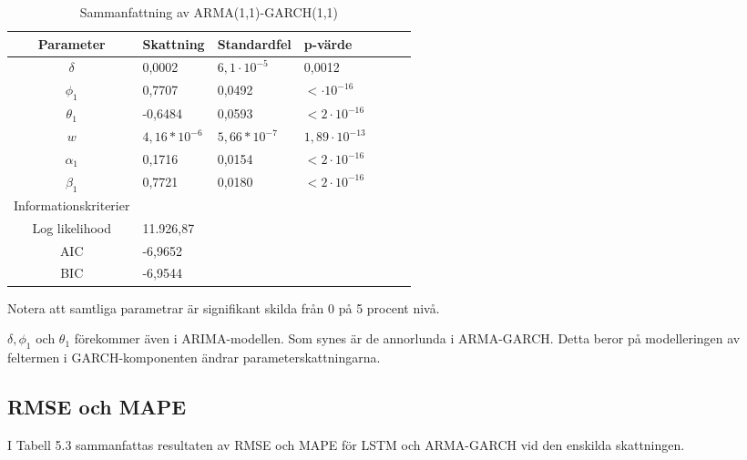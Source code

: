 \documentclass[11pt]{article}
\numberwithin{equation}{section}
\numberwithin{table}{section}
\numberwithin{figure}{section}
\begin{document}
\begin{table}[H]
\caption{Sammanfattning av ARMA(1,1)-GARCH(1,1)}
\begin{tabularx}{\textwidth}{c *{6}{Y}}
\toprule
Parameter  & Skattning & Standardfel & p-värde \\
\hline

$\delta$      & 0,0002         & $6,1\cdot10^{-5}$ & 0,0012           \\
$\phi_1$      & 0,7707         & 0,0492         & $<\cdot10^{-16}$    \\

$\theta_1$    & -0,6484        & 0,0593         & $<2\cdot10^{-16}$    \\
$w$           & $4,16*10^{-6}$ & $5,66*10^{-7}$ & $1,89\cdot10^{-13}$  \\

$\alpha_1$    & 0,1716         & 0,0154         & $<2\cdot10^{-16}$    \\
$\beta_1$     & 0,7721         & 0,0180         & $<2\cdot10^{-16}$    \\ 
\midrule

Informationskriterier  & &  &  \\
\hline

Log likelihood & 11.926,87       &                &                  \\
AIC            & -6,9652        &                &                   \\

BIC            & -6,9544         &                &                   \\
\bottomrule
\end{tabularx}
\footnotesize{Notera att samtliga parametrar är signifikant skilda från 0 på 5 procent nivå.}
\end{table}






$\delta, \phi_1$ och $\theta_1$ förekommer även i ARIMA-modellen. Som synes är de annorlunda i ARMA-GARCH. Detta beror på modelleringen av feltermen i GARCH-komponenten ändrar parameterskattningarna.

\subsection{RMSE och MAPE}
I Tabell 5.3 sammanfattas resultaten av RMSE och MAPE för LSTM och ARMA-GARCH vid den enskilda skattningen.
\end{document}
